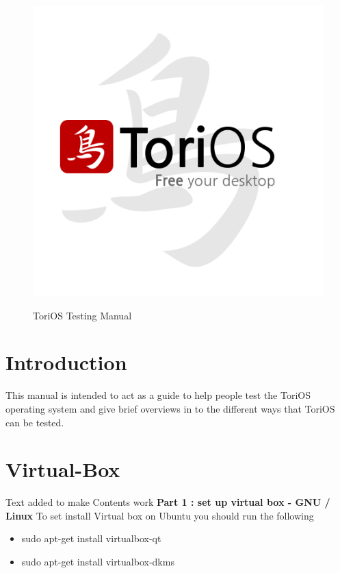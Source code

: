 \documentclass[12pt,a4paper]{book}
\author{Paul Sutton}
\begin{document}
\begin{figure}
\centering
\includegraphics[width=0.7\linewidth]{./FinalLogo}

\begin{center}
{\Huge ToriOS Testing Manual}
\end{center}

\end{figure}

\tableofcontents
{}

\chapter{Introduction}
This manual is intended to act as a guide to help people test the ToriOS \cite{ToriOS} operating system and give brief overviews in to the different ways that ToriOS can be tested. 

\chapter{Virtual-Box}
Text added to make Contents work
\textbf{Part 1 : set up virtual box - GNU / Linux}
To set install Virtual box on Ubuntu you should run the following \\

\begin{itemize}
\item{sudo apt-get install virtualbox-qt}
\item{sudo apt-get install virtualbox-dkms}
\end{itemize} 
\end{document}
